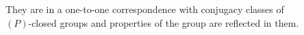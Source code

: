 \documentclass[preview]{standalone}
\begin{document}
\begin{center}
They are in a one-to-one correspondence with conjugacy classes of \\ $(P)$-closed groups and properties of the group are reflected in them.
\end{center}
\end{document}
